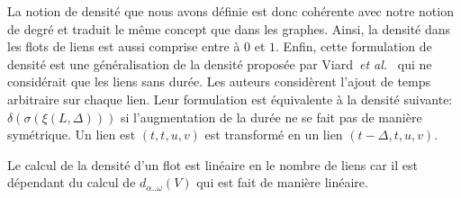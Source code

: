 La notion de densité que nous avons définie est donc cohérente avec notre notion de degré et traduit le même concept que dans les graphes.
Ainsi, la densité dans les flots de liens est aussi comprise entre à $0$ et $1$.
Enfin, cette formulation de densité est une généralisation de la densité proposée par Viard~\emph{et al.}~\cite{Viard2014a} qui ne considérait que les liens sans durée.
Les auteurs considèrent l'ajout de temps arbitraire sur chaque lien.
Leur formulation est équivalente à la densité suivante: $\delta( \sigma(\xi(L,\Delta)))$ si l'augmentation de la durée ne se fait pas de manière symétrique.
Un lien est $(t,t,u,v)$ est transformé en un lien $(t-\Delta,t,u,v)$.

Le calcul de la densité d'un flot est linéaire en le nombre de liens car il est dépendant du calcul de $d_{\alpha..\omega}(V)$  qui est fait de manière linéaire.

